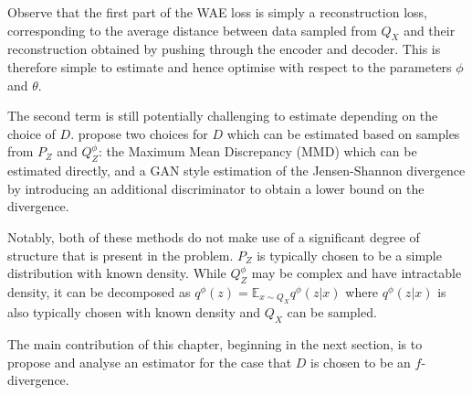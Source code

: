 
Observe that the first part of the WAE loss is simply a reconstruction loss, corresponding to the average distance between data sampled from $Q_X$ and their reconstruction obtained by pushing through the encoder and decoder.
This is therefore simple to estimate and hence optimise with respect to the parameters $\phi$ and $\theta$.

The second term is still potentially challenging to estimate depending on the choice of $D$. 
\cite{tolstikhin} propose two choices for $D$ which can be estimated based on samples from $P_Z$ and $Q_Z^\phi$: the Maximum Mean Discrepancy (MMD) \cite{gretton} which can be estimated directly, and a GAN style estimation of the Jensen-Shannon divergence by introducing an additional discriminator to obtain a lower bound on the divergence. 

Notably, both of these methods do not make use of a significant degree of structure that is present in the problem. $P_Z$ is typically chosen to be a simple distribution with known density. While $Q_Z^\phi$ may be complex and have intractable density, it can be decomposed as $q^\phi(z) = \mathbb{E}_{x\sim Q_X} q^\phi(z|x)$ where $q^\phi(z|x)$ is also typically chosen with known density and $Q_X$ can be sampled.

The main contribution of this chapter, beginning in the next section, is to propose and analyse an estimator for the case that $D$ is chosen to be an $f$-divergence. 


